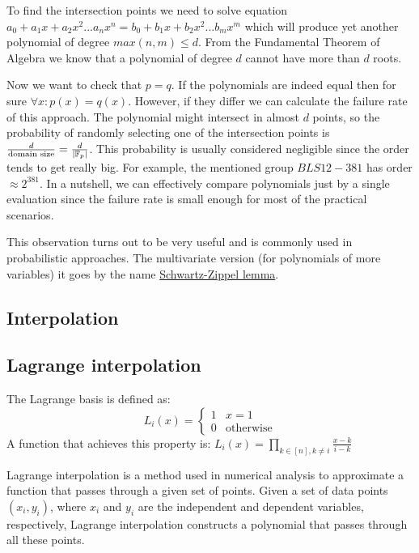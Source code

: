 \begin{dukaz} \newline
    To find the intersection points we need to solve equation $a_0 + a_1x + a_2x^2 ... a_nx^n = b_0 + b_1x + b_2x^2 ... b_m x^m$ which will produce yet another polynomial of degree $max(n,m) \leq d$. From the Fundamental Theorem of Algebra we know that a polynomial of degree $d$ cannot have more than $d$ roots.
\end{dukaz}

Now we want to check that $p = q$. If the polynomials are indeed equal then for sure $\forall x: p(x) = q(x)$. However, if they differ we can calculate the failure rate of this approach. The polynomial might intersect in almost $d$ points, so the probability of randomly selecting one of the intersection points is $\frac{d}{\text{domain size}} = \frac{d}{|\mathbb{F}_p|}$. This probability is usually considered negligible since the order tends to get really big. For example, the mentioned group $BLS12-381$ has order $\approx 2^{381}$. In a nutshell, we can effectively compare polynomials just by a single evaluation since the failure rate is small enough for most of the practical scenarios.

This observation turns out to be very useful and is commonly used in probabilistic approaches. The multivariate version (for polynomials of more variables) it goes by the name \href{https://en.wikipedia.org/wiki/Schwartz%E2%80%93Zippel_lemma}{Schwartz-Zippel lemma}.


\subsection{Interpolation}
\subsection{Lagrange interpolation}
\begin{definition}
    The Lagrange basis is defined as:
    $$
    L_i(x) = 
        \begin{cases} 
            1 & x = 1 \\
            0 & \text{otherwise}
       \end{cases}
    $$
    A function that achieves this property is: $L_i(x) = \prod_{k \in [n], k \neq i} \frac{x-k}{i-k}$
\end{definition}

Lagrange interpolation is a method used in numerical analysis to approximate a function that passes through a given set of points. Given a set of data points $(x_i, y_i)$, where $x_i$ and $y_i$ are the independent and dependent variables, respectively, Lagrange interpolation constructs a polynomial that passes through all these points.


